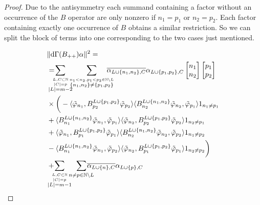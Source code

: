 \documentclass[b5paper,draft,openbib,12pt]{memoir}
\begin{document}
\begin{proof}
Due to the antisymmetry each summand containing 
a factor without an occurrence of the \(B\) operator are only 
nonzero if \(n_1=p_1\) or \(n_2=p_2\). Each factor containing 
exactly one occurrence of \(B\) obtains a similar restriction. 
So we can split the block of terms into one corresponding 
to the two cases just mentioned. 

\begin{align}\nonumber
  &\|\mathrm{d}\Gamma(B_{++})\alpha\|^2 = \\\nonumber
  &= \hspace{-0.4cm}\sum_{\overset{L,C\subset \mathbb{N}}{\overset{|C|=p}{|L|=m-2}}}\hspace{-0.2cm}\sum_{\overset{n_1<n_2,p_1<p_2\in\mathbb{N}\backslash L }{\{n_1,n_2\}\neq \{p_1,p_2\}}}
  \hspace{-0.4cm}\overline{\alpha_{L\cup\{n_1,n_2\},C}}\alpha_{L\cup\{p_1,p_2\},C}
\left[\begin{matrix}n_1\\n_2\end{matrix}\right]
\left[\begin{matrix}p_1\\p_2\end{matrix}\right]\\\label{B++ long estimate}
    &\times \bigg(
    -\langle \tilde{\varphi}_{n_1},B^{L\cup\{p_1,p_2\}}_{p_2}\tilde{\varphi}_{p_2} \rangle \langle B^{L\cup\{n_1,n_2\}}_{n_2} \tilde{\varphi}_{n_2}, \tilde{\varphi}_{p_1}\rangle 1_{n_1\neq p_1}\\
    &+\langle B^{L\cup\{n_1,n_2\}}_{n_1}\tilde{\varphi}_{n_1},\tilde{\varphi}_{p_1} \rangle \langle  \tilde{\varphi}_{n_2}, B^{L\cup\{p_1,p_2\}}_{p_2}\tilde{\varphi}_{p_2}\rangle 1_{n_2\neq p_1}\notag\\
    &+\langle \tilde{\varphi}_{n_1},B^{L\cup\{p_1,p_2\}}_{p_1}\tilde{\varphi}_{p_1} \rangle \langle B^{L\cup\{n_1,n_2\}}_{n_2} \tilde{\varphi}_{n_2}, \tilde{\varphi}_{p_2}\rangle 1_{n_1\neq p_2}\notag\\
    &-\langle B^{L\cup\{n_1,n_2\}}_{n_1} \tilde{\varphi}_{n_1},\tilde{\varphi}_{p_2} \rangle \langle  \tilde{\varphi}_{n_2},B^{L\cup\{p_1,p_2\}}_{p_1} \tilde{\varphi}_{p_1}\rangle 1_{n_2\neq p_2} \bigg)\notag\\
  &+\hspace{-0.4cm}\sum_{\overset{L,C\subset \mathbb{N}}{\overset{|C|=p}{|L|=m-1}}}\hspace{-0.2cm}\sum_{n\neq p\in\mathbb{N}\backslash L }
  \hspace{-0.4cm}\overline{\alpha_{L\cup\{n\},C}}\alpha_{L\cup\{p\},C}

\end{align}
\end{proof}
\end{document}
